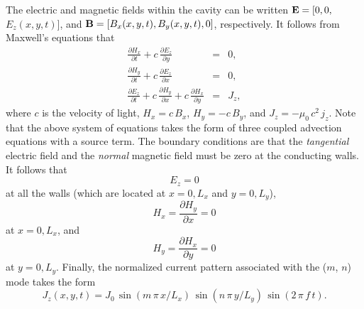 The electric and magnetic fields within the cavity can be written
${\bf E} = [0,0,$\\ $E_z(x,y,t)]$, and ${\bf B} = [B_x(x,y,t), B_y(x,y,t), 0]$, respectively.
It follows from Maxwell's equations that
\begin{eqnarray}
\frac{\partial H_x}{\partial t} + c\,\frac{\partial E_z}{\partial y} &=& 0,\label{rc1}\\[0.5ex]
\frac{\partial H_y}{\partial t} + c\,\frac{\partial E_z}{\partial x} &=& 0,\\[0.5ex]
\frac{\partial E_z}{\partial t} + c\,\frac{\partial H_y}{\partial x}
+ c\,\frac{\partial H_x}{\partial y}&=& J_z,\label{rc3}
\end{eqnarray}
where $c$ is the velocity of light, $H_x=c\,B_x$, $H_y=-c\,B_y$, and $J_z =-\mu_0\,c^2\,j_z$. Note that the
above system of equations takes the form of three coupled advection equations with a source term.
The boundary conditions are that the {\em tangential} electric field and the {\em normal}
magnetic field must be zero at the conducting walls. It follows that
\begin{equation}
E_z=0\label{rcbc1}
\end{equation}
at all the walls (which are located at $x=0,L_x$ and $y=0,L_y$), 
\begin{equation}
H_x = \frac{\partial H_y}{\partial x} = 0
\end{equation}
at $x=0,L_x$, and
\begin{equation}
H_y = \frac{\partial H_x}{\partial y} = 0\label{rcbc2}
\end{equation}
at $y=0,L_y$. Finally, the normalized current pattern associated
with the ($m$, $n$) mode takes the form
\begin{equation}
J_z(x,y,t) = J_0\,\sin(m\,\pi\,x/L_x)\,\sin(n\,\pi\,y/L_y)\,\sin(2\,\pi\,f\,t).
\end{equation}

